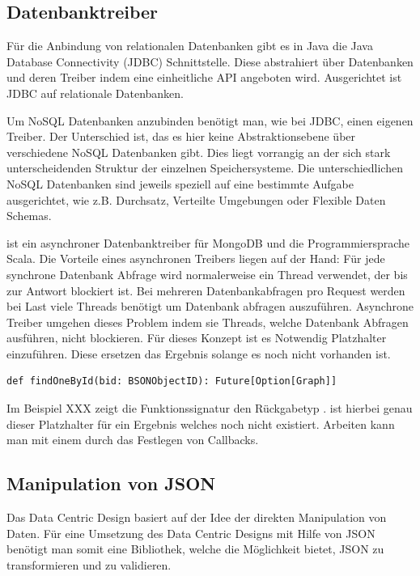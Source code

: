 \subsection{Datenbanktreiber}
Für die Anbindung von relationalen Datenbanken gibt es in Java die Java Database Connectivity (JDBC) Schnittstelle. Diese abstrahiert über Datenbanken und deren Treiber indem eine einheitliche API angeboten wird. Ausgerichtet ist JDBC auf relationale Datenbanken.

Um NoSQL Datenbanken anzubinden benötigt man, wie bei JDBC, einen eigenen Treiber. Der Unterschied ist, das es hier keine Abstraktionsebene über verschiedene NoSQL Datenbanken gibt. Dies liegt vorrangig an der sich stark unterscheidenden Struktur der einzelnen Speichersysteme. Die unterschiedlichen NoSQL Datenbanken sind jeweils speziell auf eine bestimmte Aufgabe ausgerichtet, wie z.B. Durchsatz, Verteilte Umgebungen oder Flexible Daten Schemas. 

 ist ein asynchroner Datenbanktreiber für MongoDB und die Programmiersprache Scala. Die Vorteile eines asynchronen Treibers liegen auf der Hand: Für jede synchrone Datenbank Abfrage wird normalerweise ein Thread verwendet, der bis zur Antwort blockiert ist. Bei mehreren Datenbankabfragen pro Request werden bei Last viele Threads benötigt um Datenbank abfragen auszuführen. Asynchrone Treiber umgehen dieses Problem indem sie Threads, welche Datenbank Abfragen ausführen, nicht blockieren. Für dieses Konzept ist es Notwendig Platzhalter einzuführen. Diese ersetzen das Ergebnis solange es noch nicht vorhanden ist.

\begin{lstlisting}[caption=Funktionssignatur für asynchronen Datenbankzugriff]
def findOneById(bid: BSONObjectID): Future[Option[Graph]]
\end{lstlisting}
 
Im Beispiel XXX zeigt die Funktionssignatur den Rückgabetyp .  ist hierbei genau dieser Platzhalter für ein Ergebnis welches noch nicht existiert. Arbeiten kann man mit einem  durch das Festlegen von Callbacks.


\subsection{Manipulation von JSON}
Das Data Centric Design basiert auf der Idee der direkten Manipulation von Daten. Für eine Umsetzung des Data Centric Designs mit Hilfe von JSON benötigt man somit eine Bibliothek, welche die Möglichkeit bietet, JSON zu transformieren und zu validieren.
 
